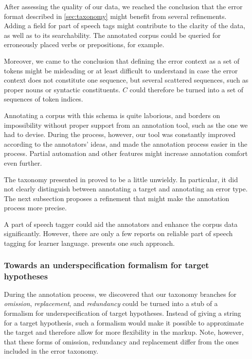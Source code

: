 \documentclass{article}
\begin{document}
After assessing the quality of our data, we reached
the conclusion that the error format described in \ref{sec:taxonomy}
might benefit from several refinements. Adding a field for part of speech tags
might contribute to the clarity of the data, as well as to its searchability.
The annotated corpus could be queried for erroneously placed verbs or
prepositions, for example.

Moreover, we came to the conclusion that defining the error context as a set of
tokens might be misleading or at least difficult to understand in case the error
context does not constitute one sequence, but several scattered sequences, such
as proper nouns or syntactic constituents. $C$ could therefore be turned into a
set of sequences of token indices.

Annotating a corpus with this schema is quite laborious, and borders on
impossibility without proper support from an annotation tool, such as the one we
had to devise. During the process, however, our tool was constantly improved
according to the annotators' ideas, and made the annotation process easier in
the process. Partial automation and other features might increase annotation
comfort even further.

The taxonomy presented in \label{taxonomy} proved to be a little unwieldy. In
particular, it did not clearly distinguish between annotating a target and
annotating an error type. The next subsection proposes a refinement that might
make the annotation process more precise.

A part of speech tagger could aid the annotators and enhance the corpus data
significantly. However, there are only a few reports on reliable part of speech
tagging for learner language. \cite{ludeling} presents one such approach.

\subsubsection{Towards an underspecification formalism for target hypotheses}

During the annotation process, we discovered that our taxonomy branches for
\textit{omission}, \textit{replacement}, and \textit{redundancy} could be turned
into a stub of a formalism for underspecification of target hypotheses. Instead
of giving a string for a target hypothesis, such a formalism would make it
possible to approximate the target and therefore allow for more flexibility in
the markup. Note, however, that these forms of omission, redundancy and
replacement differ from the ones included in the error taxonomy.
\end{document}
